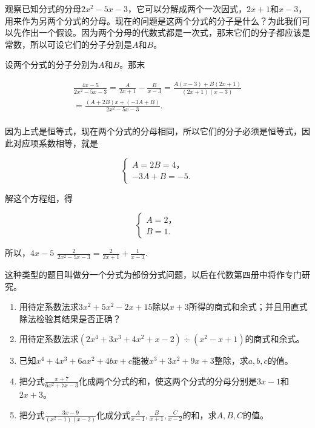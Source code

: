 观察已知分式的分母\(2x^{2} - 5x - 3\)，它可以分解成两个一次因式，\(2x + 1\)和\(x - 3\)，用来作为另两个分式的分母。现在的问题是这两个分式的分子是什么？为此我们可以先作出一个假设。因为两个分母的代数式都是一次式，那末它们的分子都应该是常数，所以可设它们的分子分别是\(A\)和\(B\)。

 设两个分式的分子分别为\(A\)和\(B\)。那末

\[
\begin{array}{l} \frac{4 x - 5}{2 x ^ {2} - 5 x - 3} = \frac{A}{2 x + 1} - \frac{B}{x - 3} = \frac{A (x - 3) + B (2 x + 1)}{(2 x + 1) (x - 3)} \\ = \frac{(A + 2 B) x + (- 3 A + B)}{2 x ^ {2} - 5 x - 3}. \\ \end{array}
\]

因为上式是恒等式，现在两个分式的分母相同，所以它们的分子必须是恒等式，因此对应项系数相等，就是

\[
\left\{ \begin{array}{l} A = 2 B = 4\text{，} \\ - 3 A + B = - 5. \end{array} \right.
\]

解这个方程组，得

\[
\left\{ \begin{array}{l} A = 2\text{，} \\ B = 1. \end{array} \right.
\]

所以，\(4x - 5\) \(\frac{2}{2x^2 - 5x - 3} = \frac{2}{2x + 1} +\frac{1}{x - 3}.\)

这种类型的题目叫做分一个分式为部份分式问题，以后在代数第四册中将作专门研究。

\begin{enumerate}
\item
  用待定系数法求\(3x^{2} + 5x^{2} - 2x + 15\)除以\(x + 3\)所得的商式和余式；并且用直式除法检验其结果是否正确？
\item
  用待定系数法求\((2x^{4} + 3x^{3} + 4x^{2} + x - 2) \div (x^{2} - x + 1)\)的商式和余式。
\item
  已知\(x^4 + 4x^3 + 6ax^2 + 4bx + c\)能被\(x^3 + 3x^2 + 9x + 3\)整除，求\(a, b, c\)的值。
\item
  把分式\(\frac{x + 7}{6x^2 + 7x - 3}\)化成两个分式的和，使这两个分式的分母分别是\(3x - 1\)和\(2x + 3\)。
\item
  把分式\(\frac{3x - 9}{(x^2 - 1)(x - 2)}\)化成分式\(\frac{A}{x - 1}, \frac{B}{x + 1}, \frac{C}{x - 2}\)的和，求\(A, B, C\)的值。
\end{enumerate}


